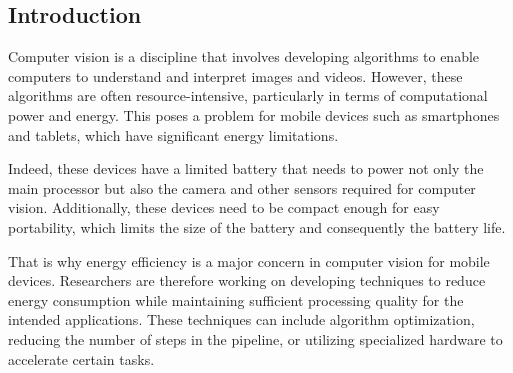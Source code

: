 \subsection*{Introduction}
Computer vision is a discipline that involves developing algorithms to enable computers to understand and interpret images and videos. However, these algorithms are often resource-intensive, particularly in terms of computational power and energy. This poses a problem for mobile devices such as smartphones and tablets, which have significant energy limitations.

Indeed, these devices have a limited battery that needs to power not only the main processor but also the camera and other sensors required for computer vision. Additionally, these devices need to be compact enough for easy portability, which limits the size of the battery and consequently the battery life.

That is why energy efficiency is a major concern in computer vision for mobile devices. Researchers are therefore working on developing techniques to reduce energy consumption while maintaining sufficient processing quality for the intended applications. These techniques can include algorithm optimization, reducing the number of steps in the pipeline, or utilizing specialized hardware to accelerate certain tasks.